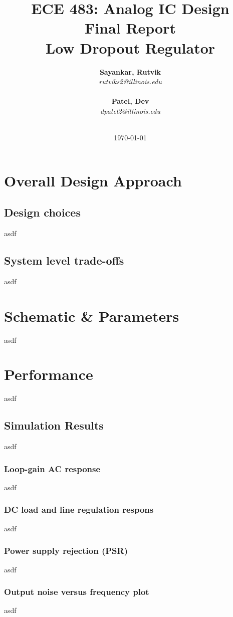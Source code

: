 \documentclass{report}
\title{ECE 483: Analog IC Design \\ Final Report \\ Low Dropout Regulator} %
\author {
    \textbf{Sayankar, Rutvik}\\
    \textit{rutviks2@illinois.edu} \\
    \hfill \\ 
    \textbf{Patel, Dev}\\
    \textit{dpatel2@illinois.edu} \\
    \hfill \\ 
}
\date{\today} %
\begin{document}
    \maketitle %
    
    \pagebreak


    \chapter{Overall Design Approach}
    \section{Design choices}
    asdf

    \section{System level trade-offs}
    asdf

    \chapter{Schematic \& Parameters}
    asdf

    \chapter{Performance}
    asdf

    \section{Simulation Results}
    asdf

    \subsection{Loop-gain AC response}
    asdf
    \subsection{DC load and line regulation respons}
    asdf
    \subsection{ Power supply rejection (PSR)}
    asdf
    \subsection{Output noise versus frequency plot}
    asdf
\end{document}
